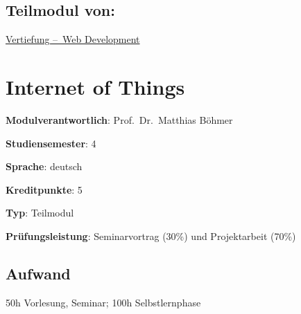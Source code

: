 \hypertarget{teilmodul-vonpathlabelmi-2017modulbeschreibungen-bachelorba_wd_frontend-development}{%
\section*{Teilmodul
von:\label{/mi-2017/modulbeschreibungen-bachelor/BA_WD_Frontend-Development}}\label{teilmodul-vonpathlabelmi-2017modulbeschreibungen-bachelorba_wd_frontend-development}}

\hyperref[/mi-2017/modulbeschreibungen-bachelor/BA_Vertiefung-Web_Development]{Vertiefung – Web Development}

\hypertarget{internet-of-thingspathlabelmi-2017modulbeschreibungen-bachelorba_wd_internet-of-things}{%
\chapter{Internet of
Things\label{/mi-2017/modulbeschreibungen-bachelor/BA_WD_Internet-of-things}}\label{internet-of-thingspathlabelmi-2017modulbeschreibungen-bachelorba_wd_internet-of-things}}

\begin{modulHead}
\textbf{Modulverantwortlich}: Prof.~Dr.~Matthias
Böhmer
\end{modulHead}
\begin{modulHead}
\textbf{Studiensemester}:
4
\end{modulHead}
\begin{modulHead}
\textbf{Sprache}:
deutsch
\end{modulHead}
\begin{modulHead}
\textbf{Kreditpunkte}:
5
\end{modulHead}
\begin{modulHead}
\textbf{Typ}:
Teilmodul
\end{modulHead}
\begin{modulHead}
\textbf{Prüfungsleistung}:
Seminarvortrag (30\%) und Projektarbeit (70\%)
\end{modulHead}


\hypertarget{aufwandpathlabelmi-2017modulbeschreibungen-bachelorba_wd_internet-of-things}{%
\section*{Aufwand\label{/mi-2017/modulbeschreibungen-bachelor/BA_WD_Internet-of-things}}\label{aufwandpathlabelmi-2017modulbeschreibungen-bachelorba_wd_internet-of-things}}

50h Vorlesung, Seminar; 100h Selbstlernphase

